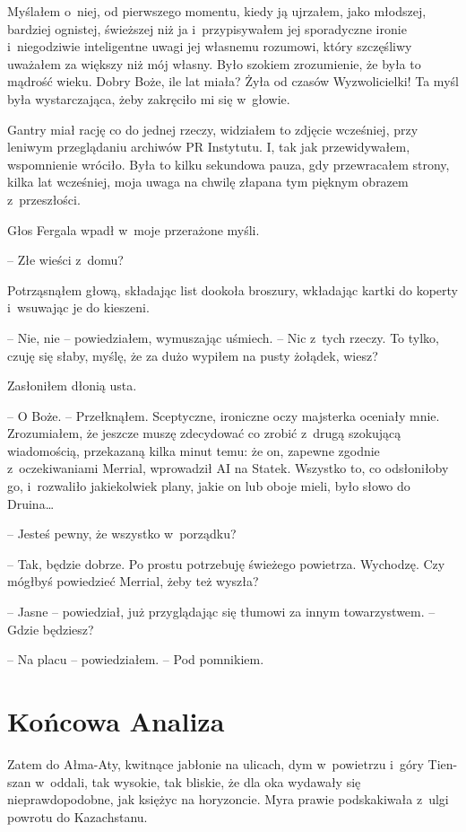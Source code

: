 \documentclass[oneside,polish,11pt,sfheadings]{mwbk}
\begin{document}
Myślałem o~niej, od pierwszego momentu, kiedy ją ujrzałem, jako
młodszej, bardziej ognistej, świeższej niż ja i~przypisywałem jej
sporadyczne ironie i~niegodziwie inteligentne uwagi jej własnemu
rozumowi, który szczęśliwy uważałem za większy niż mój własny. Było
szokiem zrozumienie, że była to mądrość wieku. Dobry Boże, ile lat
miała? Żyła od czasów Wyzwolicielki! Ta myśl była wystarczająca, żeby
zakręciło mi się w~głowie.

Gantry miał rację co do jednej rzeczy, widziałem to zdjęcie wcześniej,
przy leniwym przeglądaniu archiwów PR Instytutu. I, tak jak
przewidywałem, wspomnienie wróciło. Była to kilku sekundowa pauza, gdy
przewracałem strony, kilka lat wcześniej, moja uwaga na chwilę złapana
tym pięknym obrazem z~przeszłości.

Głos Fergala wpadł w~moje przerażone myśli.

-- Złe wieści z~domu?

Potrząsnąłem głową, składając list dookoła broszury, wkładając kartki do
koperty i~wsuwając je do kieszeni.

-- Nie, nie -- powiedziałem, wymuszając uśmiech. -- Nic z~tych rzeczy. To
tylko, czuję się słaby, myślę, że za dużo wypiłem na pusty żołądek,
wiesz?

Zasłoniłem dłonią usta.

-- O Boże. -- Przełknąłem. Sceptyczne, ironiczne oczy majsterka oceniały
mnie. Zrozumiałem, że jeszcze muszę zdecydować co zrobić z~drugą
szokującą wiadomością, przekazaną kilka minut temu: że on, zapewne
zgodnie z~oczekiwaniami Merrial, wprowadził AI na Statek. Wszystko to,
co odsłoniłoby go, i~rozwaliło jakiekolwiek plany, jakie on lub oboje
mieli, było słowo do Druina\ldots

-- Jesteś pewny, że wszystko w~porządku?

-- Tak, będzie dobrze. Po prostu potrzebuję świeżego powietrza. Wychodzę.
Czy mógłbyś powiedzieć Merrial, żeby też wyszła?

-- Jasne -- powiedział, już przyglądając się tłumowi za innym
towarzystwem. -- Gdzie będziesz?

-- Na placu -- powiedziałem. -- Pod pomnikiem.


\chapter{Końcowa Analiza}

Zatem do Ałma-Aty, kwitnące jabłonie na ulicach, dym w~powietrzu i~góry
Tien-szan w~oddali, tak wysokie, tak bliskie, że dla oka wydawały się
nieprawdopodobne, jak księżyc na horyzoncie. Myra prawie podskakiwała z~ulgi powrotu do Kazachstanu.
\end{document}
